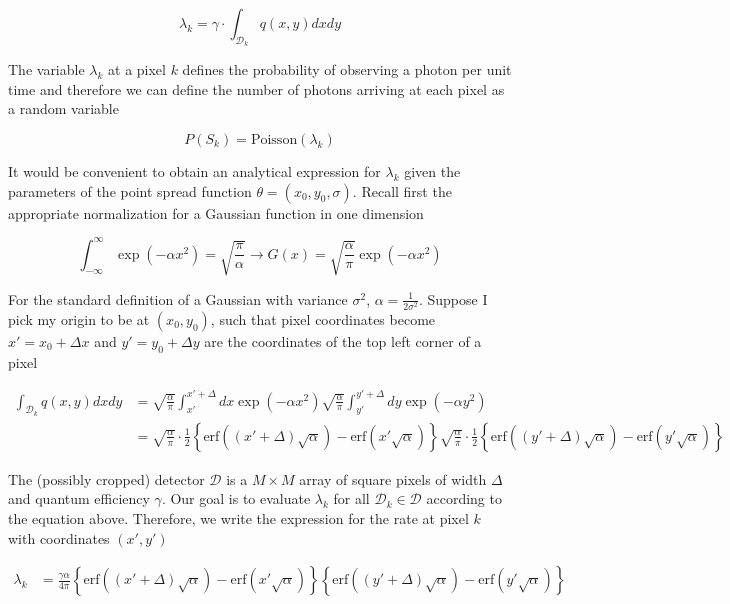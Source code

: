 \documentclass{ucetd}
\begin{document}
\begin{equation}
\lambda_{k} = \gamma\cdot\int_{\mathcal{D}_{k}} q(x,y)dxdy
\end{equation}

The variable $\lambda_{k}$ at a pixel $k$ defines the probability of observing a photon per unit time and therefore we can define the number of photons arriving at each pixel as a random variable

\begin{equation*}
P(S_{k}) = \mathrm{Poisson}(\lambda_{k})
\end{equation*}


It would be convenient to obtain an analytical expression for $\lambda_{k}$ given the parameters of the point spread function $\theta = (x_0,y_0,\sigma)$. Recall first the appropriate normalization for a Gaussian function in one dimension

\begin{equation*}
\int_{-\infty}^{\infty}\exp(-\alpha x^{2}) = \sqrt{\frac{\pi}{\alpha}} \rightarrow G(x) = \sqrt{\frac{\alpha}{\pi}}\exp(-\alpha x^{2})
\end{equation*}


For the standard definition of a Gaussian with variance $\sigma^{2}$, $\alpha = \frac{1}{2\sigma^{2}}$. Suppose I pick my origin to be at $(x_{0},y_{0})$, such that pixel coordinates become $x' = x_{0} + \Delta x$ and $y' = y_{0} + \Delta y$ are the coordinates of the top left corner of a pixel

\begin{align*}
\int_{\mathcal{D}_{k}} q(x,y)dxdy &= \sqrt{\frac{\alpha}{\pi}}\int_{x'}^{x'+\Delta}dx\exp\left(-\alpha x^{2}\right) \sqrt{\frac{\alpha}{\pi}}\int_{y'}^{y' + \Delta}dy\exp\left(-\alpha y^{2}\right)\\
&=\sqrt{\frac{\alpha}{\pi}}\cdot\frac{1}{2}\left\{\mathrm{erf}((x'+\Delta)\sqrt{\alpha})-\mathrm{erf}(x'\sqrt{\alpha})\right\}\sqrt{\frac{\alpha}{\pi}}\cdot\frac{1}{2}\left\{\mathrm{erf}((y'+\Delta)\sqrt{\alpha})-\mathrm{erf}(y'\sqrt{\alpha})\right\}
\end{align*}

The (possibly cropped) detector $\mathcal{D}$ is a $M\times M$ array of square pixels of width $\Delta$ and quantum efficiency $\gamma$. Our goal is to evaluate $\lambda_{k}$ for all $\mathcal{D}_{k} \in \mathcal{D}$ according to the equation above. Therefore, we write the expression for the rate at pixel $k$ with coordinates $(x',y')$

\begin{align}
\lambda_{k} &= \frac{\gamma\alpha}{4\pi}\left\{\mathrm{erf}((x'+\Delta)\sqrt{\alpha})-\mathrm{erf}(x'\sqrt{\alpha})\right\}\left\{\mathrm{erf}((y'+\Delta)\sqrt{\alpha})-\mathrm{erf}(y'\sqrt{\alpha})\right\}
\end{align}
\end{document}
